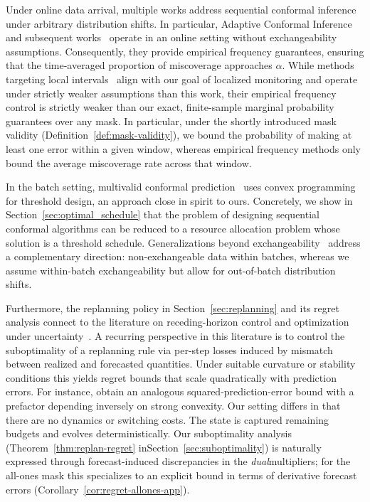 \documentclass{uai2026} %
\newcommand{\1}{\mathbf{1}}
\begin{document}
Under online data arrival, multiple works address sequential conformal inference under arbitrary distribution shifts. In particular, Adaptive Conformal Inference~\citep{gibbs2021adaptive} and subsequent works~\citep{bhatnagar2023improved,angelopoulos2023conformal,gibbs2024conformal} operate in an online setting without exchangeability assumptions. Consequently, they provide empirical frequency guarantees, ensuring that the time-averaged proportion of miscoverage approaches $\alpha$. While methods targeting local intervals~\citep{bhatnagar2023improved,gibbs2024conformal} align with our goal of localized monitoring and operate under strictly weaker assumptions than this work, their empirical frequency control is strictly weaker than our exact, finite-sample marginal probability guarantees over any mask. In particular, under the shortly introduced mask validity (Definition~\ref{def:mask-validity}), we bound the probability of making at least one error within a given window, whereas empirical frequency methods only bound the average miscoverage rate across that window.

In the batch setting, multivalid conformal prediction~\citep{jung2023batch} uses convex programming for threshold design, an approach close in spirit to ours. Concretely, we show in Section~\ref{sec:optimal_schedule} that the problem of designing sequential conformal algorithms can be reduced to a resource allocation problem whose solution is a threshold schedule. Generalizations beyond exchangeability~\citep{barber2023conformal} address a complementary direction: non-exchangeable data within batches, whereas we assume within-batch exchangeability but allow for out-of-batch distribution shifts.


Furthermore, the replanning policy in Section~\ref{sec:replanning} and its regret analysis connect to the literature on receding-horizon control and optimization under uncertainty~\citep{lin2021perturbation,lin2022bounded,li2020leveraging,vera2021online}. A recurring perspective in this literature is to control the suboptimality of a
replanning rule via per-step losses induced by mismatch between realized and forecasted quantities. Under suitable curvature or stability conditions this yields regret bounds that scale quadratically with prediction errors. For instance,  \citet{li2020leveraging} obtain an analogous squared-prediction-error bound with a prefactor depending inversely on strong convexity.
Our setting differs in that there are no dynamics or switching costs. The state  is captured remaining budgets and evolves deterministically. Our suboptimality analysis (Theorem~\ref{thm:replan-regret} inSection~\ref{sec:suboptimality}) is naturally expressed through forecast-induced discrepancies in the \emph{dual}multipliers; for the all-ones mask this specializes to an explicit bound in terms of derivative forecast errors
(Corollary~\ref{cor:regret-allones-app}).
\end{document}
